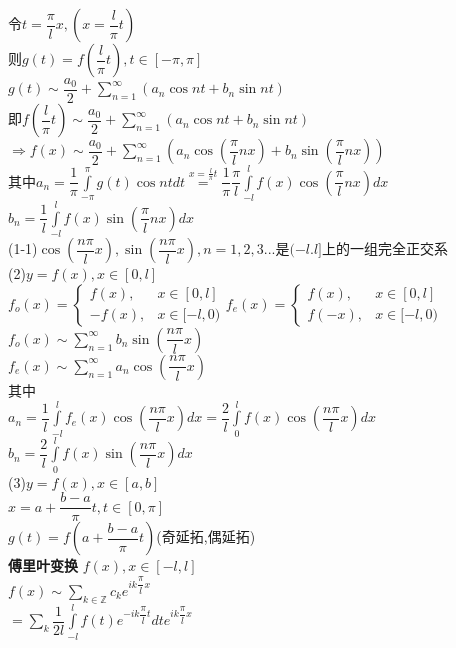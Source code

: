 \documentclass[11pt, a4paper, UTF8]{ctexart}
\begin{document}
令$t=\dfrac{\pi}{l}x,(x=\dfrac{l}{\pi}t)$\\
则$g(t)=f(\dfrac{l}{\pi}t),t\in[-\pi,\pi]$\\
$g(t)\sim\dfrac{a_0}{2}+\sum\limits_{n=1}^{\infty}(a_n\cos nt+b_n\sin nt)$\\
即$f(\dfrac{l}{\pi}t)\sim\dfrac{a_0}{2}+\sum\limits_{n=1}^{\infty}(a_n\cos nt+b_n\sin nt)$\\
$\Rightarrow f(x)\sim\dfrac{a_0}{2}+\sum\limits_{n=1}^{\infty}(a_n\cos(\dfrac{\pi}{l}nx)+b_n\sin(\dfrac{\pi}{l}nx))$\\
其中$a_n=\dfrac{1}{\pi}\int\limits_{-\pi}^{\pi}g(t)\cos ntdt\overset{x=\frac{l}{\pi}t}{=}\dfrac{1}{\pi}\dfrac{\pi}{l}\int\limits_{-l}^{l}f(x)\cos(\dfrac{\pi}{l}nx)dx$\\
$b_n=\dfrac{1}{l}\int\limits_{-l}^{l}f(x)\sin(\dfrac{\pi}{l}nx)dx$\\
(1-1)$\cos(\dfrac{n\pi}{l}x),\sin(\dfrac{n\pi}{l}x),n=1,2,3...$是$(-l.l]$上的一组完全正交系\\
(2)$y=f(x),x\in[0,l]$\\
$
f_o(x)=
\begin{cases}
f(x),&x\in[0,l]\\
-f(x),&x\in[-l,0)
\end{cases}
f_e(x)=
\begin{cases}
f(x),&x\in[0,l]\\
f(-x),&x\in[-l,0)
\end{cases}
$\\
$f_o(x)\sim\sum\limits_{n=1}^{\infty}b_n\sin(\dfrac{n\pi}{l}x)$\\
$f_e(x)\sim\sum\limits_{n=1}^{\infty}a_n\cos(\dfrac{n\pi}{l}x)$\\
其中\\
$a_n=\dfrac{1}{l}\int\limits_{-l}^lf_e(x)\cos(\dfrac{n\pi}{l}x)dx=\dfrac{2}{l}\int\limits_0^lf(x)\cos(\dfrac{n\pi}{l}x)dx$\\
$b_n=\dfrac{2}{l}\int\limits_{0}^lf(x)\sin(\dfrac{n\pi}{l}x)dx$\\
(3)$y=f(x),x\in[a,b]$\\
$x=a+\dfrac{b-a}{\pi}t,t\in[0,\pi]$\\
$g(t)=f(a+\dfrac{b-a}{\pi}t)$(奇延拓,偶延拓)\\
\def\mysum{\sum\limits_{n=1}^{\infty}}
\def\myint{\int\limits_{-\pi}^{\pi}}
\textbf{傅里叶变换}
$f(x),x\in[-l,l]$\\
$f(x)\sim\sum\limits_{k\in\mathbb{Z}}c_ke^{ik\dfrac{\pi}{l}x}$\\
$=\sum\limits_{k}\dfrac{1}{2l}\int\limits^l_{-l}f(t)e^{-ik\dfrac{\pi}{l}t}dte^{ik\dfrac{\pi}{l}x}$\\
\end{document}
